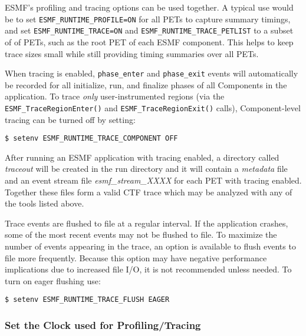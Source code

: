 ESMF's profiling and tracing options can be used together.  A typical
use would be to set {\tt ESMF\_RUNTIME\_PROFILE=ON} for all PETs to
capture summary timings, and set {\tt ESMF\_RUNTIME\_TRACE=ON} and
{\tt ESMF\_RUNTIME\_TRACE\_PETLIST} to a subset of of PETs,
such as the root PET of each ESMF component. This helps to keep trace
sizes small while still providing timing summaries over all PETs.

When tracing is enabled, {\tt phase\_enter} and {\tt phase\_exit} events will
automatically be recorded for all initialize, run, and finalize phases of all
Components in the application. To trace {\em only} user-instrumented regions (via
the {\tt ESMF\_TraceRegionEnter()} and {\tt ESMF\_TraceRegionExit()} calls),
Component-level tracing can be turned off by setting:

\begin{verbatim}
$ setenv ESMF_RUNTIME_TRACE_COMPONENT OFF
\end{verbatim}

After running an ESMF application with tracing enabled, a directory
called {\em traceout} will be created in the run directory and it will
contain a {\em metadata} file and an event stream file {\em esmf\_stream\_XXXX}
for each PET with tracing enabled. Together these files form a valid
CTF trace which may be analyzed with any of the tools listed above.

Trace events are flushed to file at a regular interval. If the application
crashes, some of the most recent events may not be flushed to file. To
maximize the number of events appearing in the trace, an option is available
to flush events to file more frequently. Because this option may have
negative performance implications due to increased file I/O, it is not
recommended unless needed. To turn on eager flushing use:

\begin{verbatim}
$ setenv ESMF_RUNTIME_TRACE_FLUSH EAGER
\end{verbatim}

\subsubsection{Set the Clock used for Profiling/Tracing}
\label{sec:TracingClocks}

